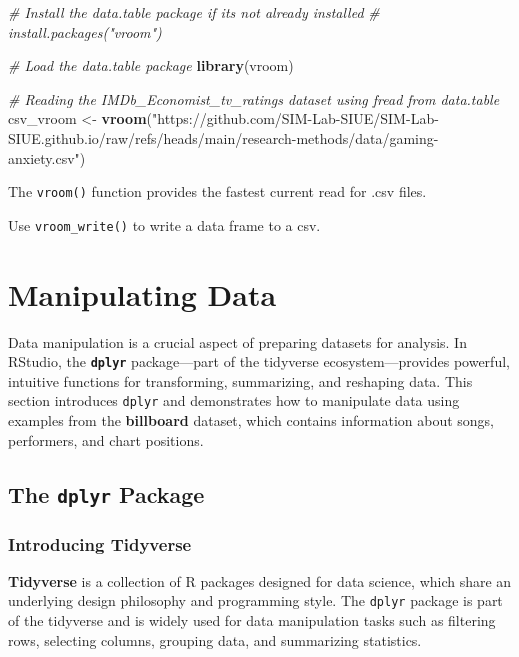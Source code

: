 \documentclass[
]{book}
\newenvironment{Shaded}{\begin{snugshade}}{\end{snugshade}}
\newcommand{\CommentTok}[1]{\textcolor[rgb]{0.56,0.35,0.01}{\textit{#1}}}
\newcommand{\FunctionTok}[1]{\textcolor[rgb]{0.13,0.29,0.53}{\textbf{#1}}}
\newcommand{\NormalTok}[1]{#1}
\newcommand{\OtherTok}[1]{\textcolor[rgb]{0.56,0.35,0.01}{#1}}
\newcommand{\StringTok}[1]{\textcolor[rgb]{0.31,0.60,0.02}{#1}}
\begin{document}
\begin{Shaded}
\begin{Highlighting}[]
\CommentTok{\# Install the data.table package if it\textquotesingle{}s not already installed}
\CommentTok{\# install.packages("vroom")}

\CommentTok{\# Load the data.table package}
\FunctionTok{library}\NormalTok{(vroom)}

\CommentTok{\# Reading the IMDb\_Economist\_tv\_ratings dataset using fread from data.table}
\NormalTok{csv\_vroom }\OtherTok{\textless{}{-}} \FunctionTok{vroom}\NormalTok{(}\StringTok{"https://github.com/SIM{-}Lab{-}SIUE/SIM{-}Lab{-}SIUE.github.io/raw/refs/heads/main/research{-}methods/data/gaming{-}anxiety.csv"}\NormalTok{)}
\end{Highlighting}
\end{Shaded}

The \texttt{vroom()} function provides the fastest current read for .csv files.

Use \texttt{vroom\_write()} to write a data frame to a csv.

\section{Manipulating Data}\label{manipulating-data}

Data manipulation is a crucial aspect of preparing datasets for analysis. In RStudio, the \textbf{\texttt{dplyr}} package---part of the tidyverse ecosystem---provides powerful, intuitive functions for transforming, summarizing, and reshaping data. This section introduces \texttt{dplyr} and demonstrates how to manipulate data using examples from the \textbf{billboard} dataset, which contains information about songs, performers, and chart positions.

\subsection*{\texorpdfstring{The \texttt{dplyr} Package}{The dplyr Package}}\label{the-dplyr-package}

\subsubsection*{Introducing Tidyverse}\label{introducing-tidyverse}

\textbf{Tidyverse} is a collection of R packages designed for data science, which share an underlying design philosophy and programming style. The \texttt{dplyr} package is part of the tidyverse and is widely used for data manipulation tasks such as filtering rows, selecting columns, grouping data, and summarizing statistics.
\end{document}
